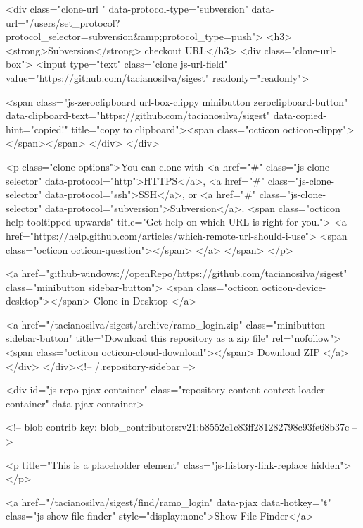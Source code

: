   

<div class="clone-url "
  data-protocol-type="subversion"
  data-url="/users/set_protocol?protocol_selector=subversion&amp;protocol_type=push">
  <h3><strong>Subversion</strong> checkout URL</h3>
  <div class="clone-url-box">
    <input type="text" class="clone js-url-field"
           value="https://github.com/tacianosilva/sigest" readonly="readonly">

    <span class="js-zeroclipboard url-box-clippy minibutton zeroclipboard-button" data-clipboard-text="https://github.com/tacianosilva/sigest" data-copied-hint="copied!" title="copy to clipboard"><span class="octicon octicon-clippy"></span></span>
  </div>
</div>


<p class="clone-options">You can clone with
      <a href="#" class="js-clone-selector" data-protocol="http">HTTPS</a>,
      <a href="#" class="js-clone-selector" data-protocol="ssh">SSH</a>,
      or <a href="#" class="js-clone-selector" data-protocol="subversion">Subversion</a>.
  <span class="octicon help tooltipped upwards" title="Get help on which URL is right for you.">
    <a href="https://help.github.com/articles/which-remote-url-should-i-use">
    <span class="octicon octicon-question"></span>
    </a>
  </span>
</p>


  <a href="github-windows://openRepo/https://github.com/tacianosilva/sigest" class="minibutton sidebar-button">
    <span class="octicon octicon-device-desktop"></span>
    Clone in Desktop
  </a>

              <a href="/tacianosilva/sigest/archive/ramo_login.zip"
                 class="minibutton sidebar-button"
                 title="Download this repository as a zip file"
                 rel="nofollow">
                <span class="octicon octicon-cloud-download"></span>
                Download ZIP
              </a>
            </div>
        </div><!-- /.repository-sidebar -->

        <div id="js-repo-pjax-container" class="repository-content context-loader-container" data-pjax-container>
          


<!-- blob contrib key: blob_contributors:v21:b8552c1c83ff281282798c93fe68b37c -->

<p title="This is a placeholder element" class="js-history-link-replace hidden"></p>

<a href="/tacianosilva/sigest/find/ramo_login" data-pjax data-hotkey="t" class="js-show-file-finder" style="display:none">Show File Finder</a>

